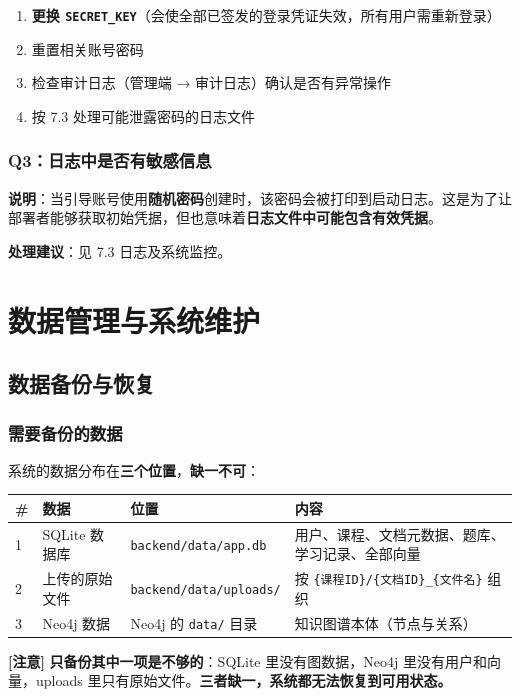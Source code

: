 \documentclass[UTF8,a4paper,11pt]{ctexrep}
\newcommand{\warnmark}{\textcolor{todobar}{\textbf{[注意]}}}
\begin{document}
\begin{enumerate}
\item \textbf{更换 \texttt{SECRET\_KEY}}（会使全部已签发的登录凭证失效，所有用户需重新登录）
\item 重置相关账号密码
\item 检查审计日志（管理端 → 审计日志）确认是否有异常操作
\item 按 7.3 处理可能泄露密码的日志文件
\end{enumerate}

\subsection{Q3：日志中是否有敏感信息}

\textbf{说明}：当引导账号使用\textbf{随机密码}创建时，该密码会被打印到启动日志。这是为了让部署者能够获取初始凭据，但也意味着\textbf{日志文件中可能包含有效凭据}。

\textbf{处理建议}：见 7.3 日志及系统监控。


\chapter{数据管理与系统维护}


\section{数据备份与恢复}


\subsection{需要备份的数据}

系统的数据分布在\textbf{三个位置}，\textbf{缺一不可}：

\begin{center}
\small
\begin{tabularx}{\linewidth}{@{}XXXX@{}}
\toprule
\# & 数据 & 位置 & 内容 \\
\midrule
1 & SQLite 数据库 & \texttt{backend/data/app.db} & 用户、课程、文档元数据、题库、学习记录、全部向量 \\
2 & 上传的原始文件 & \texttt{backend/data/uploads/} & 按 \texttt{\{课程ID\}/\{文档ID\}\_\{文件名\}} 组织 \\
3 & Neo4j 数据 & Neo4j 的 \texttt{data/} 目录 & 知识图谱本体（节点与关系） \\
\bottomrule
\end{tabularx}
\end{center}
\begin{todobox}
\warnmark{} \textbf{只备份其中一项是不够的}：SQLite 里没有图数据，Neo4j 里没有用户和向量，uploads 里只有原始文件。\textbf{三者缺一，系统都无法恢复到可用状态。}

\end{todobox}
\end{document}
